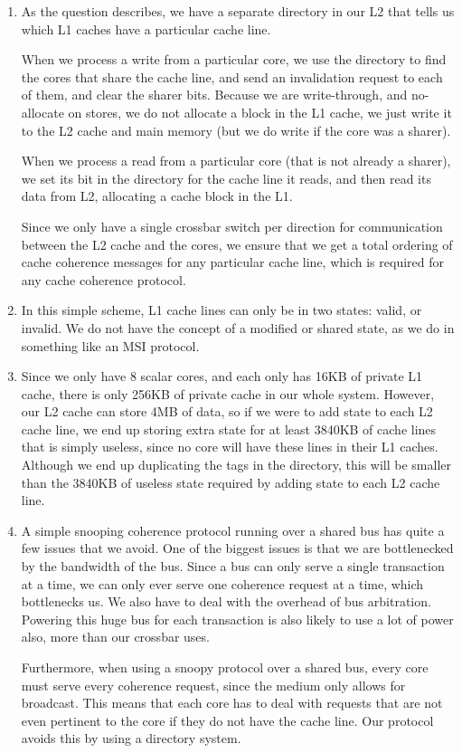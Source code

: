 


\begin{enumerate}[label=(\alph*)]
  \item
    As the question describes, we have a separate directory in our L2 that tells us which L1 caches have a particular cache line.

    When we process a write from a particular core, we use the directory to find the cores that share the cache line, and send an invalidation request to each of them, and clear the sharer bits. Because we are write-through, and no-allocate on stores, we do not allocate a block in the L1 cache, we just write it to the L2 cache and main memory (but we do write if the core was a sharer).

    When we process a read from a particular core (that is not already a sharer), we set its bit in the directory for the cache line it reads, and then read its data from L2, allocating a cache block in the L1.

    Since we only have a single crossbar switch per direction for communication between the L2 cache and the cores, we ensure that we get a total ordering of cache coherence messages for any particular cache line, which is required for any cache coherence protocol.

  \item
    In this simple scheme, L1 cache lines can only be in two states: valid, or invalid. We do not have the concept of a modified or shared state, as we do in something like an MSI protocol.

  \item
    Since we only have 8 scalar cores, and each only has 16KB of private L1 cache, there is only 256KB of private cache in our whole system. However, our L2 cache can store 4MB of data, so if we were to add state to each L2 cache line, we end up storing extra state for at least 3840KB of cache lines that is simply useless, since no core will have these lines in their L1 caches. Although we end up duplicating the tags in the directory, this will be smaller than the 3840KB of useless state required by adding state to each L2 cache line.

  \item
    A simple snooping coherence protocol running over a shared bus has quite a few issues that we avoid. One of the biggest issues is that we are bottlenecked by the bandwidth of the bus. Since a bus can only serve a single transaction at a time, we can only ever serve one coherence request at a time, which bottlenecks us. We also have to deal with the overhead of bus arbitration. Powering this huge bus for each transaction is also likely to use a lot of power also, more than our crossbar uses.

    Furthermore, when using a snoopy protocol over a shared bus, every core must serve every coherence request, since the medium only allows for broadcast. This means that each core has to deal with requests that are not even pertinent to the core if they do not have the cache line. Our protocol avoids this by using a directory system.

        
\end{enumerate}

